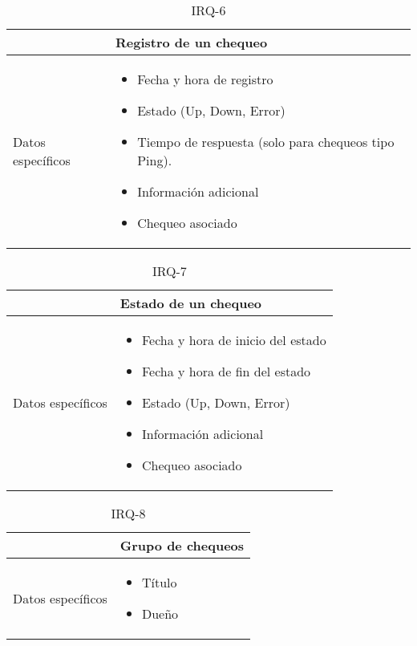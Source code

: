 \begin{table}[h!]
  \centering
  \begin{tabularx}{\textwidth}{|l|X|}
    \hline

    & Registro de un chequeo \\

    \hline
    Datos específicos &

    \begin{itemize}
    \item Fecha y hora de registro
    \item Estado (Up, Down, Error)
    \item Tiempo de respuesta (solo para chequeos tipo Ping).
    \item Información adicional
    \item Chequeo asociado
    \end{itemize}
    \\
    
    \hline
    
  \end{tabularx}
  \caption{IRQ-6}
\end{table}

\begin{table}[h!]
  \centering
  \begin{tabularx}{\textwidth}{|l|X|}
    \hline

    & Estado de un chequeo \\

    \hline
    Datos específicos &

    \begin{itemize}
    \item Fecha y hora de inicio del estado
    \item Fecha y hora de fin del estado
    \item Estado (Up, Down, Error)
    \item Información adicional
    \item Chequeo asociado
    \end{itemize}
    \\
    
    \hline
    
  \end{tabularx}
  \caption{IRQ-7}
\end{table}

\begin{table}[h!]
  \centering
  \begin{tabularx}{\textwidth}{|l|X|}
    \hline

    & Grupo de chequeos \\

    \hline
    Datos específicos &

    \begin{itemize}
      \item Título
      \item Dueño
    \end{itemize}
    \\
    
    \hline
    
  \end{tabularx}
  \caption{IRQ-8}
\end{table}

